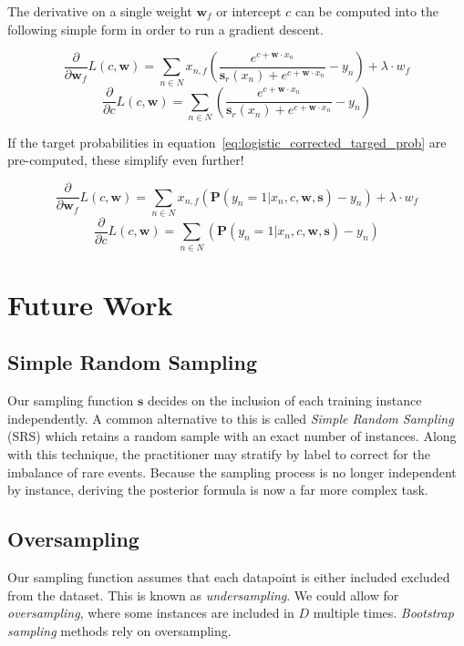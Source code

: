 \documentclass[twoside]{article}
\begin{document}
The derivative on a single weight \(\mathbf{w}_f\) or intercept \(c\) can be computed into the following simple form in order to run a gradient descent.

\[\frac{\partial}{\partial \mathbf{w}_f }L(c,\mathbf{w})=\sum_{n \in  N} x_{n,f}\left(\frac{e^{c+\mathbf{w} \cdot x_n}}{\mathbf{s}_r(x_n)+e^{c+\mathbf{w} \cdot x_n}} -y_n  \right )+ \lambda \cdot w_f\]
\[\frac{\partial}{\partial c}L(c,\mathbf{w})=\sum_{n \in  N} \left(\frac{e^{c+\mathbf{w} \cdot x_n}}{\mathbf{s}_r(x_n)+e^{c+\mathbf{w} \cdot x_n}}  -y_n\right )\]

If the target probabilities in equation~\eqref{eq:logistic_corrected_targed_prob} are pre-computed, these simplify even further!

\[\frac{\partial}{\partial \mathbf{w}_f }L(c,\mathbf{w})=\sum_{n \in  N} x_{n,f}\left(\mathbf{P}(y_n = 1|x_n,c,\mathbf{w},\mathbf{s}) -y_n  \right )+ \lambda \cdot w_f\]
\[\frac{\partial}{\partial c}L(c,\mathbf{w})=\sum_{n \in  N} \left(\mathbf{P}(y_n = 1|x_n,c,\mathbf{w},\mathbf{s})  -y_n\right )\]

\section{Future Work}
\label{section:future_work}

\subsection{Simple Random Sampling}

Our sampling function \(\mathbf{s}\) decides on the inclusion of each training instance independently. A common alternative to this is called \textit{Simple Random Sampling} (SRS) which retains a random sample with an exact number of instances. Along with this technique, the practitioner may stratify by label to correct for the imbalance of rare events. Because the sampling process is no longer independent by instance, deriving the posterior formula is now a far more complex task.

\subsection{Oversampling}

Our sampling function assumes that each datapoint is either included excluded from the dataset. This is known as \textit{undersampling}. We could allow for \textit{oversampling}, where some instances are included in \(D\) multiple times. \textit{Bootstrap sampling} methods rely on oversampling.
\end{document}
